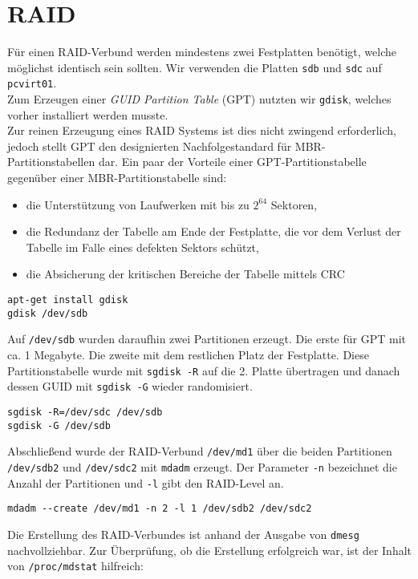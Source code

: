 \section{RAID}
\label{raid}
Für einen RAID-Verbund werden mindestens zwei Festplatten benötigt, welche möglichst identisch sein sollten. Wir verwenden die Platten \verb#sdb# und \verb#sdc# auf \verb#pcvirt01#. \\
Zum Erzeugen einer \emph{GUID Partition Table} (GPT) nutzten wir \verb#gdisk#, welches vorher installiert werden musste. \\ 
Zur reinen Erzeugung eines RAID Systems ist dies nicht zwingend erforderlich, jedoch stellt GPT den designierten Nachfolgestandard für MBR-Partitionstabellen dar. Ein paar der Vorteile einer GPT-Partitionstabelle gegenüber einer MBR-Partitionstabelle sind\cite{gpt}:
\begin{itemize} 
\item die Unterstützung von Laufwerken mit bis zu $2^{64}$ Sektoren,
\item die Redundanz der Tabelle am Ende der Festplatte, die vor dem Verlust der Tabelle im Falle eines defekten Sektors schützt,
\item die Absicherung der kritischen Bereiche der Tabelle mittels CRC
\end{itemize}
\begin{verbatim}
apt-get install gdisk
gdisk /dev/sdb
\end{verbatim}
Auf \verb#/dev/sdb# wurden daraufhin zwei Partitionen erzeugt. Die erste für GPT mit ca. 1 Megabyte. Die zweite mit dem restlichen Platz der Festplatte.
Diese Partitionstabelle wurde mit \verb#sgdisk -R# auf die 2. Platte übertragen und danach dessen GUID mit \verb#sgdisk -G# wieder randomisiert.
\begin{verbatim}
sgdisk -R=/dev/sdc /dev/sdb
sgdisk -G /dev/sdb
\end{verbatim}
Abschließend wurde der RAID-Verbund \verb#/dev/md1# über die beiden Partitionen \verb#/dev/sdb2# und \verb#/dev/sdc2# mit \verb#mdadm# erzeugt. Der Parameter \verb#-n# bezeichnet die Anzahl der Partitionen und \verb#-l# gibt den RAID-Level an.
\begin{verbatim}
mdadm --create /dev/md1 -n 2 -l 1 /dev/sdb2 /dev/sdc2
\end{verbatim}
Die Erstellung des RAID-Verbundes ist anhand der Ausgabe von \verb#dmesg# nachvollziehbar. Zur Überprüfung, ob die Erstellung erfolgreich war, ist der Inhalt von \verb#/proc/mdstat# hilfreich: 
